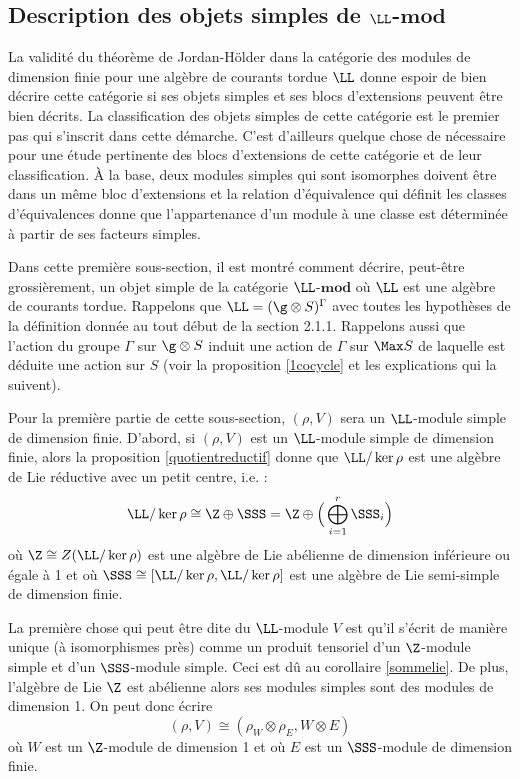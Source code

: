 \subsection{Description des objets simples de $\LL$-$\mathbf{mod}$}

La validité du théorème de Jordan-Hölder dans la catégorie des modules  de dimension finie pour une algèbre de courants tordue $\LL$ donne espoir de bien décrire cette catégorie si ses objets simples et ses blocs d'extensions peuvent être bien décrits. La classification des objets simples de cette catégorie est le premier pas qui s'inscrit dans cette démarche. C'est d'ailleurs quelque chose de nécessaire pour une étude pertinente des blocs d'extensions de cette catégorie et de leur classification. À la base, deux modules simples qui sont isomorphes doivent être dans un même bloc d'extensions et la relation d'équivalence qui définit les classes d'équivalences donne que l'appartenance d'un module à une classe est déterminée à partir de ses facteurs simples. 

Dans cette première sous-section, il est montré comment décrire, peut-être grossièrement, un objet simple de la catégorie $\LL$-$\mathbf{mod}$ où $\LL$ est une algèbre de courants tordue. Rappelons que $\LL = (\g \otimes S)^\Gamma$ avec toutes les hypothèses de la définition donnée au tout début de la section 2.1.1.  Rappelons aussi que l'action du groupe $\Gamma$ sur $\g \otimes S$ induit une action de $\Gamma$ sur $\Max S$ de laquelle est déduite une action sur $S$ (voir la proposition \ref{1cocycle} et les explications qui la suivent).

Pour la première partie de cette sous-section, $(\rho,V)$ sera un $\LL$-module simple de dimension finie. D'abord, si $(\rho,V)$ est un $\LL$-module simple de dimension finie, alors la proposition \ref{quotientreductif} donne que $\LL/\ker \rho$ est une algèbre de Lie réductive avec un petit centre, i.e. : 
\begin{equation} \label{quotientreductifirrep}
\LL / \ker \rho \cong \Z \oplus \SSS = \Z \oplus \Big(\bigoplus_{i=1}^r \SSS_i\Big)
\end{equation}
où $\Z \cong Z(\LL / \ker \rho)$ est une algèbre de Lie abélienne de dimension inférieure ou égale à 1 et où $\SSS \cong [\LL / \ker \rho,\LL / \ker \rho]$ est une algèbre de Lie semi-simple de dimension finie. 

La première chose qui peut être dite du $\LL$-module $V$ est qu'il s'écrit de manière unique (à isomorphismes près) comme un produit tensoriel d'un $\Z$-module simple et d'un $\SSS$-module simple. Ceci est dû au corollaire \ref{sommelie}. De plus, l'algèbre de Lie $\Z$ est abélienne alors ses modules simples sont des modules de dimension 1. On peut donc écrire
\begin{equation} \label{premierechose}
(\rho,V) \cong (\rho_W \otimes \rho_E, W \otimes E)
\end{equation}
où $W$ est un $\Z$-module de dimension 1 et où $E$ est un $\SSS$-module de dimension finie. 


